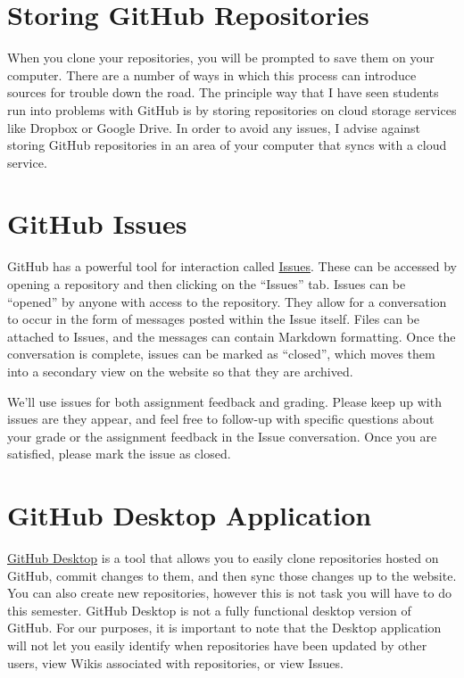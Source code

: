 \documentclass[]{book}
\begin{document}
\section{Storing GitHub Repositories}\label{storing-github-repositories}

When you clone your repositories, you will be prompted to save them on
your computer. There are a number of ways in which this process can
introduce sources for trouble down the road. The principle way that I
have seen students run into problems with GitHub is by storing
repositories on cloud storage services like Dropbox or Google Drive. In
order to avoid any issues, I advise against storing GitHub repositories
in an area of your computer that syncs with a cloud service.

\section{GitHub Issues}\label{github-issues}

GitHub has a powerful tool for interaction called
\href{https://help.github.com/articles/about-issues/}{Issues}. These can
be accessed by opening a repository and then clicking on the ``Issues''
tab. Issues can be ``opened'' by anyone with access to the repository.
They allow for a conversation to occur in the form of messages posted
within the Issue itself. Files can be attached to Issues, and the
messages can contain Markdown formatting. Once the conversation is
complete, issues can be marked as ``closed'', which moves them into a
secondary view on the website so that they are archived.

We'll use issues for both assignment feedback and grading. Please keep
up with issues are they appear, and feel free to follow-up with specific
questions about your grade or the assignment feedback in the Issue
conversation. Once you are satisfied, please mark the issue as closed.

\section{GitHub Desktop Application}\label{github-desktop-application}

\href{https://desktop.github.com}{GitHub Desktop} is a tool that allows
you to easily clone repositories hosted on GitHub, commit changes to
them, and then sync those changes up to the website. You can also create
new repositories, however this is not task you will have to do this
semester. GitHub Desktop is not a fully functional desktop version of
GitHub. For our purposes, it is important to note that the Desktop
application will not let you easily identify when repositories have been
updated by other users, view Wikis associated with repositories, or view
Issues.
\end{document}
